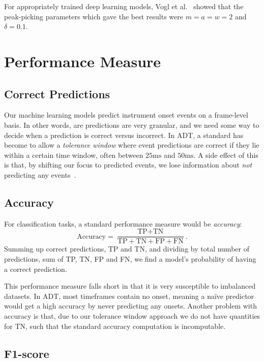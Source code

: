 For appropriately trained deep learning models, Vogl et al.~\cite{vogl2018multiinstrumentdrumtranscription} showed that the peak-picking parameters which gave the best results were $m = a = w = 2$ and $\delta = 0.1$.

\section{Performance Measure}

\subsection{Correct Predictions}

Our machine learning models predict instrument onset events on a frame-level basis. In other words, are predictions are very granular, and we need some way to decide when a prediction is correct versus incorrect. In \gls{ADT}, a standard has become to allow a \textit{tolerance window} where event predictions are correct if they lie within a certain time window, often between $25\text{ms}$ and $50\text{ms}$. A side effect of this is that, by shifting our focus to predicted events, we lose information about \textit{not} predicting any events~\cite{inproceedings}.

\subsection{Accuracy}

For classification tasks, a standard performance measure would be \textit{accuracy}: $$ \text{Accuracy} = \frac{\text{TP} + \text{TN}}{\text{TP} + \text{TN} + \text{FP} + \text{FN}}.$$ Summing up correct predictions, \gls{TP} and \gls{TN}, and dividing by total number of predictions, sum of \gls{TP}, \gls{TN}, \gls{FP} and \gls{FN}, we find a model's probability of having a correct prediction.

This performance measure falls short in that it is very susceptible to imbalanced datasets. In \gls{ADT}, most timeframes contain no onset, meaning a naïve predictor would get a high accuracy by never predicting any onsets. Another problem with accuracy is that, due to our tolerance window approach we do not have quantities for \gls{TN}, such that the standard accuracy computation is incomputable.

\subsection{F1-score}

